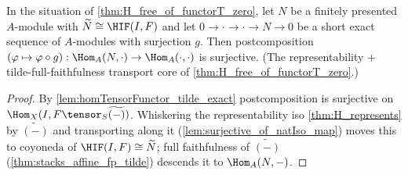 \begin{lemma}\leanok
[Postcomposition surjectivity from $T = 0$ (transport core)]
  \label{lem:hom_postcomp_surjective_of_functorT_zero}
  In the situation of \cref{thm:H_free_of_functorT_zero}, let $N$ be a finitely
  presented $A$-module with $\widetilde N \cong \HIF(I,F)$ and let
  $0 \to \cdot \to \cdot \to N \to 0$ be a short exact sequence of $A$-modules with
  surjection $g$. Then postcomposition
  $(\varphi \mapsto \varphi \circ g) : \Hom_A(N, \cdot) \to \Hom_A(\cdot, \cdot)$ is
  surjective. (The representability + tilde-full-faithfulness transport core of
  \cref{thm:H_free_of_functorT_zero}.)
  \begin{proof}
    By \cref{lem:homTensorFunctor_tilde_exact} postcomposition is surjective on
    $\Hom_X(I, F\tensor_S\widetilde{(-)})$. Whiskering the representability iso
    \cref{thm:H_represents} by $\widetilde{(-)}$ and transporting along it
    (\cref{lem:surjective_of_natIso_map}) moves this to $\mathrm{coyoneda}$ of
    $\HIF(I,F) \cong \widetilde N$; full faithfulness of $\widetilde{(-)}$
    (\cref{thm:stacks_affine_fp_tilde}) descends it to $\Hom_A(N, -)$.
  \end{proof}
\end{lemma}


